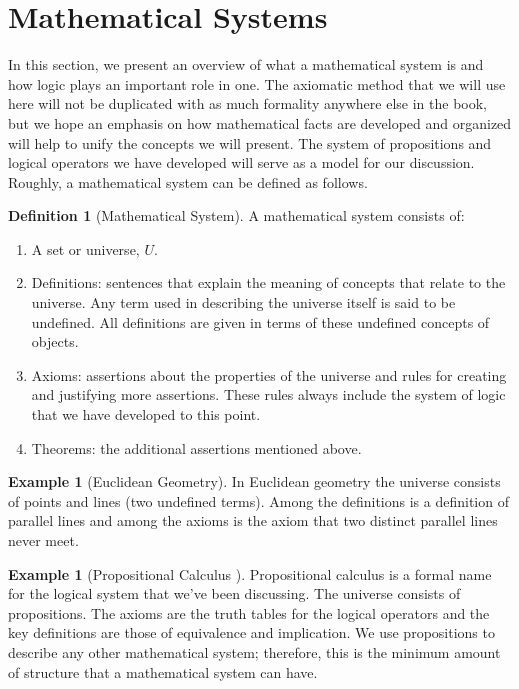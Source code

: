 \documentclass[10pt,]{book}
\theoremstyle{plain}
\theoremstyle{definition}
\newtheorem{definition}[theorem]{Definition}
\theoremstyle{definition}
\theoremstyle{definition}
\newtheorem{example}[theorem]{Example}
\theoremstyle{definition}
\begin{document}
\section[Mathematical Systems]{Mathematical Systems}\label{c3s5}
In this section, we present an overview of what a mathematical system is and how logic plays an important role in one. The axiomatic method that we will use here will not be duplicated with as much formality anywhere else in the book, but we hope an emphasis on how mathematical facts are developed and organized will help to unify the concepts we will present. The system of propositions and logical operators we have developed will serve as a model for our discussion. Roughly, a mathematical system can be defined as follows.%
\begin{definition}[Mathematical System]\label{def-mathematical-system}
A mathematical system consists of:%
\par
\leavevmode%
\begin{enumerate}[label=\arabic*]
\item\hypertarget{li-105}{}A set or universe, \(U\).%
\item\hypertarget{li-106}{}Definitions: sentences that explain the meaning of concepts that relate to the universe. Any term used in describing the universe itself is said to be undefined. All definitions are given in terms of these undefined concepts of objects.%
\item\hypertarget{li-107}{}Axioms: assertions about the properties of the universe and rules for creating and justifying more assertions. These rules always include the system of logic that we have developed to this point.%
\item\hypertarget{li-108}{}Theorems: the additional assertions mentioned above.%
\end{enumerate}
%
\end{definition}
\begin{example}[Euclidean Geometry]\label{ex-euclidean-geometry}
 In Euclidean geometry the universe consists of points and lines (two undefined terms). Among the definitions is a definition of parallel lines and among the axioms is the axiom that two distinct parallel lines never meet.%
\end{example}
\begin{example}[Propositional Calculus ]\label{ex-propositional-calculus}
 Propositional calculus is a formal name for the logical system that we've been discussing. The universe consists of propositions. The axioms are the truth tables for the logical operators and the key definitions are those of equivalence and implication. We use propositions to describe any other mathematical system; therefore, this is the minimum amount of structure that a mathematical system can have.%
\end{example}
\end{document}
